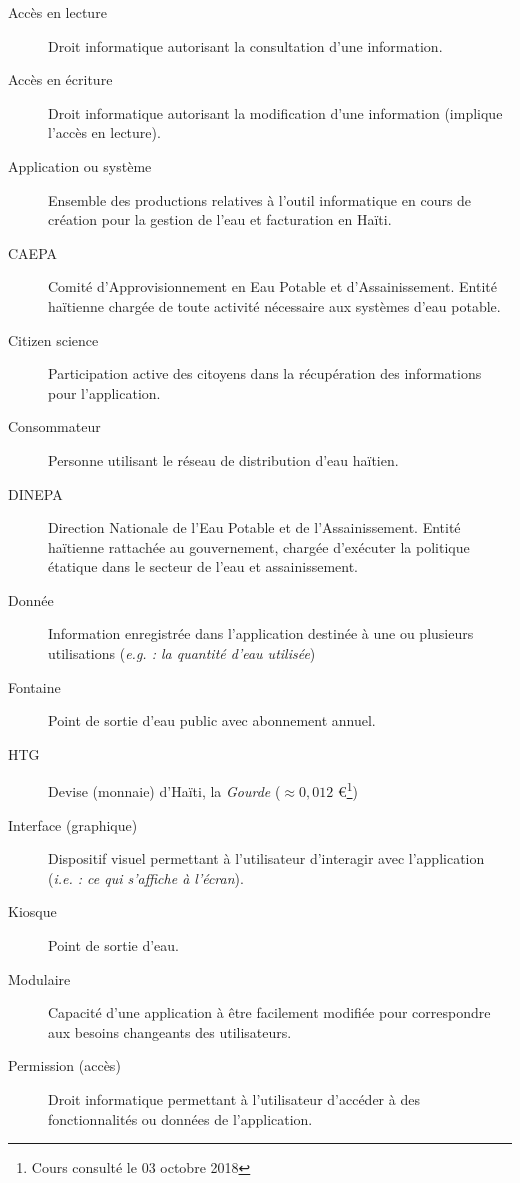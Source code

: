 \documentclass[a4paper, 11pt]{article}
\begin{document}
  \begin{description} %
    \item[Accès en lecture] Droit informatique autorisant la consultation d'une information.
    \item[Accès en écriture] Droit informatique autorisant la modification d'une information (implique l'accès en lecture).
    \item[Application ou système] Ensemble des productions relatives à l'outil informatique en cours de création pour la gestion de l'eau et facturation en Haïti.
    \item[CAEPA] Comité d'Approvisionnement en Eau Potable et d'Assainissement. Entité haïtienne chargée de toute activité nécessaire aux systèmes d'eau potable.
    \item[Citizen science] Participation active des citoyens dans la récupération des informations pour l'application.
    \item[Consommateur] Personne utilisant le réseau de distribution d'eau haïtien.
    \item[DINEPA] Direction Nationale de l'Eau Potable et de l'Assainissement. Entité haïtienne rattachée au gouvernement, chargée d'exécuter la politique étatique dans le secteur de l'eau et assainissement.
    \item[Donnée] Information enregistrée dans l'application destinée à une ou plusieurs utilisations (\emph{e.g. : la quantité d'eau utilisée})
    \item[Fontaine] Point de sortie d'eau public avec abonnement annuel.
    \item[HTG] Devise (monnaie) d'Haïti, la \emph{Gourde} ($\approx 0,012$ \euro \footnote{Cours consulté le 03 octobre 2018})
    \item[Interface (graphique)] Dispositif visuel permettant à l'utilisateur d'interagir avec l'application (\emph{i.e. : ce qui s'affiche à l'écran}).
    \item[Kiosque] Point de sortie d'eau. %
    \item[Modulaire] Capacité d'une application à être facilement modifiée pour correspondre aux besoins changeants des utilisateurs.
    \item[Permission (accès)] Droit informatique permettant à l'utilisateur d'accéder à des fonctionnalités ou données de l'application.

\end{description}
\end{document}
